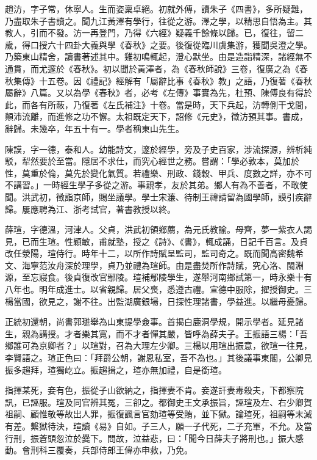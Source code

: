 \begin{pinyinscope}
趙汸，字子常，休寧人。生而姿稟卓絕。初就外傅，讀朱子《四書》，多所疑難，乃盡取朱子書讀之。聞九江黃澤有學行，往從之游。澤之學，以精思自悟為主。其教人，引而不發。汸一再登門，乃得《六經》疑義千餘條以歸。已，復往，留二歲，得口授六十四卦大義與學《春秋》之要。後復從臨川虞集游，獲聞吳澄之學。乃築東山精舍，讀書著述其中。雞初鳴輒起，澄心默坐。由是造詣精深，諸經無不通貫，而尤邃於《春秋》。初以聞於黃澤者，為《春秋師說》三卷，復廣之為《春秋集傳》十五卷。因《禮記》經解有「屬辭比事《春秋》教」之語，乃復著《春秋屬辭》八篇。又以為學《春秋》者，必考《左傳》事實為先，杜預、陳傅良有得於此，而各有所蔽，乃復著《左氏補注》十卷。當是時，天下兵起，汸轉側干戈間，顛沛流離，而進修之功不懈。太祖既定天下，詔修《元史》，徵汸預其事。書成，辭歸。未幾卒，年五十有一。學者稱東山先生。

陳謨，字一德，泰和人。幼能詩文，邃於經學，旁及子史百家，涉流探源，辨析純駁，犁然要於至當。隱居不求仕，而究心經世之務。嘗謂：「學必敦本，莫加於性，莫重於倫，莫先於變化氣質。若禮樂、刑政、錢穀、甲兵、度數之詳，亦不可不講習。」一時經生學子多從之游。事親孝，友於其弟。鄉人有為不善者，不敢使聞。洪武初，徵詣京師，賜坐議學。學士宋濂、待制王禕請留為國學師，謨引疾辭歸。屢應聘為江、浙考試官，著書教授以終。

薛瑄，字德溫，河津人。父貞，洪武初領鄉薦，為元氏教諭。母齊，夢一紫衣人謁見，已而生瑄。性穎敏，甫就塾，授之《詩》、《書》，輒成誦，日記千百言。及貞改任滎陽，瑄侍行。時年十二，以所作詩賦呈監司，監司奇之。既而聞高密魏希文、海寧范汝舟深於理學，貞乃並禮為瑄師。由是盡焚所作詩賦，究心洛、閩淵源，至忘寢食。後貞復改官鄢陵。瑄補鄢陵學生，遂舉河南鄉試第一，時永樂十有八年也。明年成進士。以省親歸。居父喪，悉遵古禮。宣德中服除，擢授御史。三楊當國，欲見之，謝不往。出監湖廣銀場，日探性理諸書，學益進。以繼母憂歸。

正統初還朝，尚書郭璡舉為山東提學僉事。首揭白鹿洞學規，開示學者。延見諸生，親為講授。才者樂其寬，而不才者憚其嚴，皆呼為薛夫子。王振語三楊：「吾鄉誰可為京卿者？」以瑄對，召為大理左少卿。三楊以用瑄出振意，欲瑄一往見，李賢語之。瑄正色曰：「拜爵公朝，謝恩私室，吾不為也。」其後議事東閣，公卿見振多趨拜，瑄獨屹立。振趨揖之，瑄亦無加禮，自是銜瑄。

指揮某死，妾有色，振從子山欲納之，指揮妻不肯。妾遂訐妻毒殺夫，下都察院訊，已誣服。瑄及同官辨其冤，三卻之。都御史王文承振旨，誣瑄及左、右少卿賀祖嗣、顧惟敬等故出人罪，振復諷言官劾瑄等受賄，並下獄。論瑄死，祖嗣等末減有差。繫獄待決，瑄讀《易》自如。子三人，願一子代死，二子充軍，不允。及當行刑，振蒼頭忽泣於爨下。問故，泣益悲，曰：「聞今日薛夫子將刑也。」振大感動。會刑科三覆奏，兵部侍郎王偉亦申救，乃免。


\end{pinyinscope}
